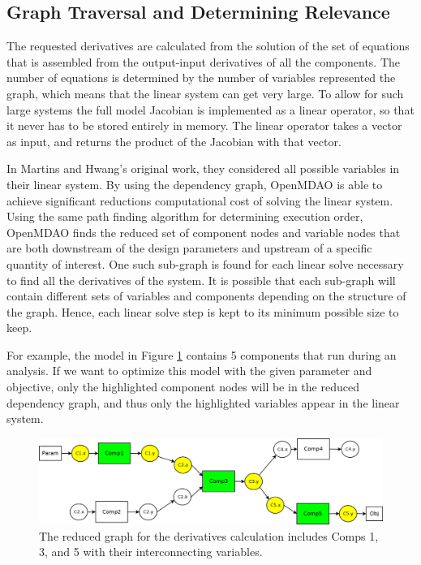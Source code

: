\documentclass[]{aiaa-tc} %
\begin{document}
    \subsection{Graph Traversal and Determining Relevance}


        The requested derivatives are calculated from the solution of the set of equations that is assembled
        from the output-input derivatives of all the components. The number of equations
        is determined by the number of variables represented the graph, which means that the linear
        system can get very large. To allow for such large systems the full model Jacobian is implemented as
        a linear operator, so that it never has to be stored entirely in memory. The
        linear operator takes a vector as input, and returns the product of the Jacobian with that vector.

        In Martins and Hwang's original work, they considered all possible variables in their linear system.
        By using the dependency graph, OpenMDAO is able to achieve significant reductions computational cost of
        solving the linear system. Using the same path finding algorithm for determining execution order,
        OpenMDAO finds the reduced set of component nodes and variable nodes that are both downstream of the design parameters
        and upstream of a specific quantity of interest. One such sub-graph is found for each linear solve necessary to
        find all the derivatives of the system. It is possible that each sub-graph will contain different sets
        of variables and components depending on the structure of the graph. Hence, each linear solve step
        is kept to its minimum possible size to keep.

        For example, the model in Figure \ref{fig:graph2} contains 5 components that run during an analysis. If we
        want to optimize this model with the given parameter and objective, only the highlighted component nodes
        will be in the reduced dependency graph, and thus only the highlighted variables appear in the linear
        system.

        \begin{figure}[!htb]\begin{center}
          \includegraphics[width=.8\textwidth]{images/Graph2}
          \caption{ The reduced graph for the derivatives calculation includes Comps 1, 3, and 5 with their interconnecting variables. \label{fig:graph2}}
        \end{center}\end{figure}
\end{document}
